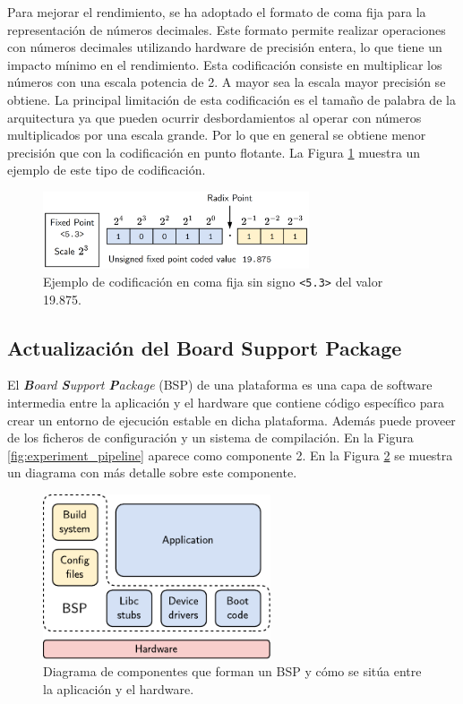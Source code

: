 Para mejorar el rendimiento, se ha adoptado el formato de coma fija para la representación de números decimales. Este formato permite realizar operaciones con números decimales utilizando hardware de precisión entera, lo que tiene un impacto mínimo en el rendimiento. Esta codificación consiste en multiplicar los números con una escala potencia de 2. A mayor sea la escala mayor precisión se obtiene. La principal limitación de esta codificación es el tamaño de palabra de la arquitectura ya que pueden ocurrir desbordamientos al operar con números multiplicados por una escala grande. Por lo que en general se obtiene menor precisión que con la codificación en punto flotante. La Figura \ref{fig:fixed_point} muestra un ejemplo de este tipo de codificación.

\begin{figure}[h]
	\centering
	\includegraphics[width=0.7\textwidth]{root/Imagenes/metodologia/fixed_point.png}
	\caption{Ejemplo de codificación en coma fija sin signo \texttt{<5.3>} del valor 19.875.}
	\label{fig:fixed_point}
\end{figure}

\subsection{Actualización del Board Support Package}

El \textit{\textbf{B}oard \textbf{S}upport \textbf{P}ackage} (BSP) de una plataforma es una capa de software intermedia entre la aplicación y el hardware que contiene código específico para crear un entorno de ejecución estable en dicha plataforma. Además puede proveer de los ficheros de configuración y un sistema de compilación. En la Figura \ref{fig:experiment_pipeline} aparece como componente 2. En la Figura \ref{fig:bsp} se muestra un diagrama con más detalle sobre este componente.

\begin{figure}[h]
	\centering
	\includegraphics[width=0.6\textwidth]{root/Imagenes/metodologia/bsp.pdf}
	\caption{Diagrama de componentes que forman un BSP y cómo se sitúa entre la aplicación y el hardware.}
	\label{fig:bsp}
\end{figure}


